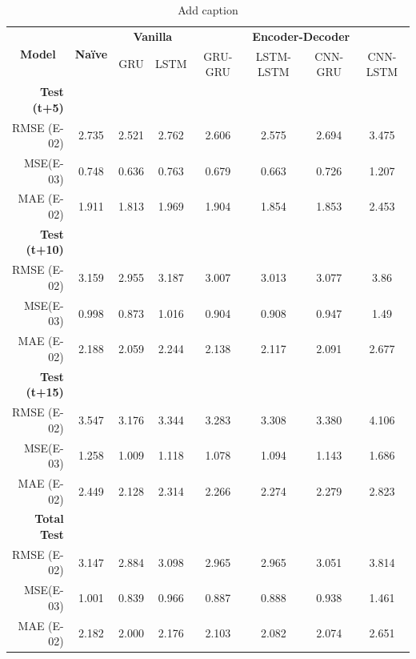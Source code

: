 \begin{table}[htbp]
  \centering
  \caption{Add caption}
    \begin{tabular}{r|c|cc|cccc}
    \multicolumn{1}{c|}{\multirow{2}[1]{*}{\textbf{Model}}} & \multirow{2}[1]{*}{\textbf{Naïve}} & \multicolumn{2}{c|}{\textbf{Vanilla}} & \multicolumn{4}{c}{\textbf{Encoder-Decoder}} \\
      &   & GRU & LSTM & GRU-GRU & LSTM-LSTM & CNN-GRU & CNN-LSTM \\
    \midrule
    \textbf{Test (t+5)} &   &   &   &   &   &   &  \\
    RMSE (E-02) & 2.735 & 2.521 & 2.762 & 2.606 & 2.575 & 2.694 & 3.475 \\
    MSE(E-03) & 0.748 & 0.636 & 0.763 & 0.679 & 0.663 & 0.726 & 1.207 \\
    MAE (E-02) & 1.911 & 1.813 & 1.969 & 1.904 & 1.854 & 1.853 & 2.453 \\
    \textbf{Test (t+10)} &   &   &   &   &   &   &  \\
    RMSE (E-02) & 3.159 & 2.955 & 3.187 & 3.007 & 3.013 & 3.077 & 3.86 \\
    MSE(E-03) & 0.998 & 0.873 & 1.016 & 0.904 & 0.908 & 0.947 & 1.49 \\
    MAE (E-02) & 2.188 & 2.059 & 2.244 & 2.138 & 2.117 & 2.091 & 2.677 \\
    \textbf{Test (t+15)} &   &   &   &   &   &   &  \\
    RMSE (E-02) & 3.547 & 3.176 & 3.344 & 3.283 & 3.308 & 3.380 & 4.106 \\
    MSE(E-03) & 1.258 & 1.009 & 1.118 & 1.078 & 1.094 & 1.143 & 1.686 \\
    MAE (E-02) & 2.449 & 2.128 & 2.314 & 2.266 & 2.274 & 2.279 & 2.823 \\
    \midrule
    \textbf{Total Test} &   &   &   &   &   &   &  \\
    RMSE (E-02) & 3.147 & 2.884 & 3.098 & 2.965 & 2.965 & 3.051 & 3.814 \\
    MSE(E-03) & 1.001 & 0.839 & 0.966 & 0.887 & 0.888 & 0.938 & 1.461 \\
    MAE (E-02) & 2.182 & 2.000 & 2.176 & 2.103 & 2.082 & 2.074 & 2.651 \\
    \end{tabular}%
  \label{tab:addlabel}%
\end{table}%











